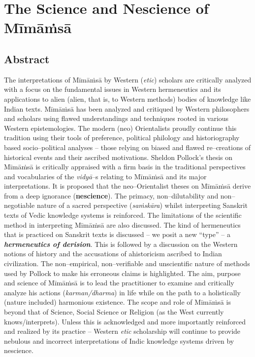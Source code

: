 
\chapter{The Science and Nescience of Mīmāṁsā}



\section*{Abstract}

The interpretations of Mīmāṁsā by Western (\textit{etic}) scholars are critically analyzed with a focus on the fundamental issues in Western hermeneutics and its applications to alien (alien, that is, to Western methods) bodies of knowledge like Indian texts. Mīmāṁsā has been analyzed and critiqued by Western philosophers and scholars using flawed understandings and techniques rooted in various Western epistemologies. The modern (neo) Orientalists proudly continue this tradition using their tools of preference, political philology and historiography based socio–political analyses – those relying on biased and flawed re–creations of historical events and their ascribed motivations. Sheldon Pollock's thesis on Mīmāṁsā is critically appraised with a firm basis in the traditional perspectives and vocabularies of the \textit{vidyā}–s relating to Mīmāṁsā and its major interpretations. It is proposed that the neo–Orientalist theses on Mīmāṁsā derive from a deep ignorance (\textbf{nescience}). The primacy, non–dilutability and non–negotiable nature of a sacred perspective (\textit{saṁskāra}) whilst interpreting Sanskrit texts of Vedic knowledge systems is reinforced. The limitations of the scientific method in interpreting Mīmāṁsā are also discussed. The kind of hermeneutics that is practiced on Sanskrit texts is discussed – we posit a new “type” – a \textbf{\textit{hermeneutics of derision}}. This is followed by a discussion on the Western notions of history and the accusations of ahistoricism ascribed to Indian civilization. The non–empirical, non–verifiable and unscientific nature of methods used by Pollock to make his erroneous claims is highlighted. The aim, purpose and science of Mīmāṁsā is to lead the practitioner to examine and critically analyze his actions (\textit{karman/dharma}) in life while on the path to a holistically (nature included) harmonious existence. The scope and role of Mīmāṁsā is beyond that of Science, Social Science or Religion (as the West currently knows/interprets). Unless this is acknowledged and more importantly reinforced and realized by its practice – Western \textit{etic} scholarship will continue to provide nebulous and incorrect interpretations of Indic knowledge systems driven by nescience.


